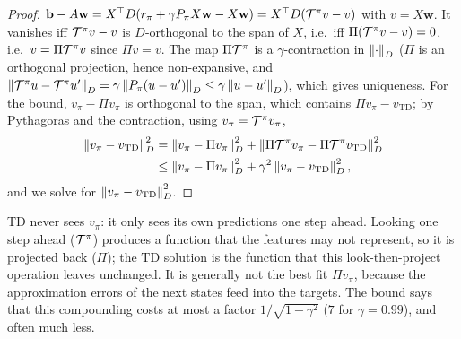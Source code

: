 \begin{proof}
  $\mathbf{b} - A \mathbf{w} = X^\top D (r_\pi + \gamma P_\pi X \mathbf{w} -
  X \mathbf{w}) = X^\top D (\mathcal{T}^\pi v - v)$ with $v = X \mathbf{w}$. It
  vanishes iff $\mathcal{T}^\pi v - v$ is $D$-orthogonal to the span of $X$, i.e.\
  iff $\Pi(\mathcal{T}^\pi v - v) = 0$, i.e.\ $v = \Pi \mathcal{T}^\pi v$ since $\Pi v = v$.
  The map $\Pi \mathcal{T}^\pi$ is a $\gamma$-contraction in $\left\lVert \cdot \right\rVert_D$
  ($\Pi$ is an orthogonal projection, hence non-expansive, and $\left\lVert \mathcal{T}^\pi
  u - \mathcal{T}^\pi u' \right\rVert_D = \gamma \left\lVert P_\pi (u - u') \right\rVert_D \leq \gamma \left\lVert u -
  u' \right\rVert_D$), which gives uniqueness. For the bound, $v_\pi - \Pi v_\pi$ is
  orthogonal to the span, which contains $\Pi v_\pi - v_{\mathrm{TD}}$; by
  Pythagoras and the contraction, using $v_\pi = \mathcal{T}^\pi v_\pi$,
  \begin{align*}
    \left\lVert v_\pi - v_{\mathrm{TD}} \right\rVert_D^2
    &= \left\lVert v_\pi - \Pi v_\pi \right\rVert_D^2 + \left\lVert \Pi \mathcal{T}^\pi v_\pi - \Pi \mathcal{T}^\pi
      v_{\mathrm{TD}} \right\rVert_D^2 \\
    &\leq \left\lVert v_\pi - \Pi v_\pi \right\rVert_D^2 + \gamma^2 \left\lVert v_\pi -
      v_{\mathrm{TD}} \right\rVert_D^2,
  \end{align*}
  and we solve for $\left\lVert v_\pi - v_{\mathrm{TD}} \right\rVert_D^2$.
\end{proof}

\begin{intuition}
  TD never sees $v_\pi$: it only sees its own predictions one step ahead.
  Looking one step ahead ($\mathcal{T}^\pi$) produces a function that the features
  may not represent, so it is projected back ($\Pi$); the TD solution is the
  function that this look-then-project operation leaves unchanged. It is
  generally not the best fit $\Pi v_\pi$, because the approximation errors
  of the next states feed into the targets. The bound says that this
  compounding costs at most a factor $1 / \sqrt{1 - \gamma^2}$ ($7$ for
  $\gamma = 0.99$), and often much less.
\end{intuition}

